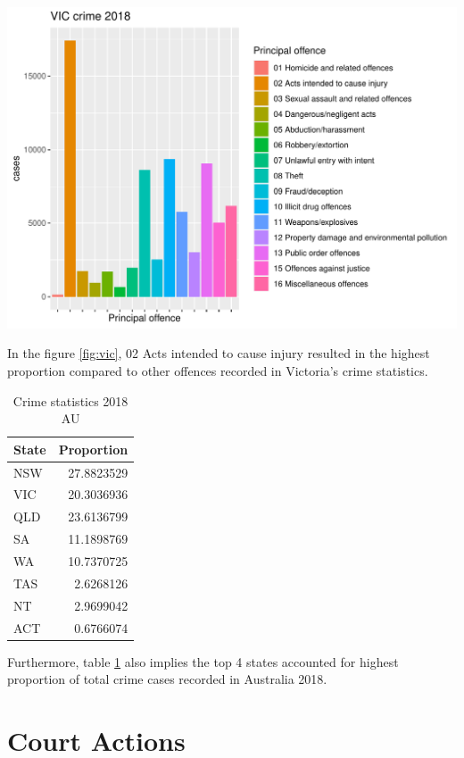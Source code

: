\documentclass[11pt,a4paper,]{article}
\let\origfigure\figure
\let\endorigfigure\endfigure
\renewenvironment{figure}[1][2] {
\expandafter\origfigure\expandafter[H]
} {
\endorigfigure
}
\begin{document}
\begin{figure}
\centering
\includegraphics{ETC5513-Assignment4_files/figure-latex/vic-1.pdf}
\caption{\label{fig:vic}VIC crime 2018}
\end{figure}

In the figure \ref{fig:vic}, 02 Acts intended to cause injury resulted in the highest proportion compared to other offences recorded in Victoria's crime statistics.

\begin{table}

\caption{\label{tab:table}Crime statistics 2018 AU}
\centering
\begin{tabular}[t]{l|r}
\hline
State & Proportion\\
\hline
NSW & 27.8823529\\
\hline
VIC & 20.3036936\\
\hline
QLD & 23.6136799\\
\hline
SA & 11.1898769\\
\hline
WA & 10.7370725\\
\hline
TAS & 2.6268126\\
\hline
NT & 2.9699042\\
\hline
ACT & 0.6766074\\
\hline
\end{tabular}
\end{table}

Furthermore, table \ref{tab:table} also implies the top 4 states accounted for highest proportion of total crime cases recorded in Australia 2018.

\section*{Court Actions}
\end{document}
